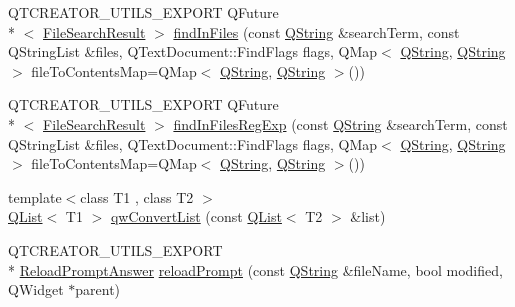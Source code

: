 \begin{DoxyCompactItemize}
Q\-T\-C\-R\-E\-A\-T\-O\-R\-\_\-\-U\-T\-I\-L\-S\-\_\-\-E\-X\-P\-O\-R\-T Q\-Future\\*
$<$ \hyperlink{class_utils_1_1_file_search_result}{File\-Search\-Result} $>$ \hyperlink{namespace_utils_a587622bfe7a8df689b88274dab06c768}{find\-In\-Files} (const \hyperlink{group___u_a_v_objects_plugin_gab9d252f49c333c94a72f97ce3105a32d}{Q\-String} \&search\-Term, const Q\-String\-List \&files, Q\-Text\-Document\-::\-Find\-Flags flags, Q\-Map$<$ \hyperlink{group___u_a_v_objects_plugin_gab9d252f49c333c94a72f97ce3105a32d}{Q\-String}, \hyperlink{group___u_a_v_objects_plugin_gab9d252f49c333c94a72f97ce3105a32d}{Q\-String} $>$ file\-To\-Contents\-Map=Q\-Map$<$ \hyperlink{group___u_a_v_objects_plugin_gab9d252f49c333c94a72f97ce3105a32d}{Q\-String}, \hyperlink{group___u_a_v_objects_plugin_gab9d252f49c333c94a72f97ce3105a32d}{Q\-String} $>$())
\item 
Q\-T\-C\-R\-E\-A\-T\-O\-R\-\_\-\-U\-T\-I\-L\-S\-\_\-\-E\-X\-P\-O\-R\-T Q\-Future\\*
$<$ \hyperlink{class_utils_1_1_file_search_result}{File\-Search\-Result} $>$ \hyperlink{namespace_utils_a1047918bf7a1fa4b7f066a4f27df1990}{find\-In\-Files\-Reg\-Exp} (const \hyperlink{group___u_a_v_objects_plugin_gab9d252f49c333c94a72f97ce3105a32d}{Q\-String} \&search\-Term, const Q\-String\-List \&files, Q\-Text\-Document\-::\-Find\-Flags flags, Q\-Map$<$ \hyperlink{group___u_a_v_objects_plugin_gab9d252f49c333c94a72f97ce3105a32d}{Q\-String}, \hyperlink{group___u_a_v_objects_plugin_gab9d252f49c333c94a72f97ce3105a32d}{Q\-String} $>$ file\-To\-Contents\-Map=Q\-Map$<$ \hyperlink{group___u_a_v_objects_plugin_gab9d252f49c333c94a72f97ce3105a32d}{Q\-String}, \hyperlink{group___u_a_v_objects_plugin_gab9d252f49c333c94a72f97ce3105a32d}{Q\-String} $>$())
\item 
{\footnotesize template$<$class T1 , class T2 $>$ }\\\hyperlink{class_q_list}{Q\-List}$<$ T1 $>$ \hyperlink{namespace_utils_a5c29006755696c9137ee52bdba2cee70}{qw\-Convert\-List} (const \hyperlink{class_q_list}{Q\-List}$<$ T2 $>$ \&list)
\item 
Q\-T\-C\-R\-E\-A\-T\-O\-R\-\_\-\-U\-T\-I\-L\-S\-\_\-\-E\-X\-P\-O\-R\-T \\*
\hyperlink{namespace_utils_a4b02d8e41b34d9ba5605aa6235965efb}{Reload\-Prompt\-Answer} \hyperlink{namespace_utils_a655096ab9b7f2728a33b2245f49dd047}{reload\-Prompt} (const \hyperlink{group___u_a_v_objects_plugin_gab9d252f49c333c94a72f97ce3105a32d}{Q\-String} \&file\-Name, bool modified, Q\-Widget $\ast$parent)
\item 

\end{DoxyCompactItemize}
